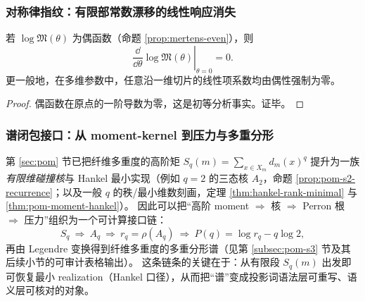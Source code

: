 \subsubsection{对称律指纹：有限部常数漂移的线性响应消失}
\begin{corollary}[偶性 \texorpdfstring{$\Rightarrow$}{=>} 一阶项消失]\label{cor:pom-logm-linear-response-zero}
若 \(\log\mathfrak{M}(\theta)\) 为偶函数（命题 \ref{prop:mertens-even}），则
$$
\left.\frac{\dd}{\dd\theta}\log\mathfrak{M}(\theta)\right|_{\theta=0}=0.
$$
更一般地，在多维参数中，任意沿一维切片的线性项系数均由偶性强制为零。
\end{corollary}
\begin{proof}
偶函数在原点的一阶导数为零，这是初等分析事实。证毕。
\end{proof}

\subsubsection{谱闭包接口：从 moment-kernel 到压力与多重分形}
\begin{remark}\label{rem:pom-moment-kernel-chain}
第 \ref{sec:pom} 节已把纤维多重度的高阶矩
\(
S_q(m)=\sum_{x\in X_m}d_m(x)^q
\)
提升为一族\emph{有限维碰撞核}与 Hankel 最小实现（例如 \(q=2\) 的三态核 \(A_2\)，命题 \ref{prop:pom-s2-recurrence}；以及一般 \(q\) 的秩/最小维数刻画，定理 \ref{thm:hankel-rank-minimal} 与 \ref{thm:pom-moment-hankel}）。
因此可以把“高阶 moment \(\Rightarrow\) 核 \(\Rightarrow\) Perron 根 \(\Rightarrow\) 压力”组织为一个可计算接口链：
$$
S_q\ \Longrightarrow\ A_q\ \Longrightarrow\ r_q=\rho(A_q)\ \Longrightarrow\ P(q)=\log r_q-q\log 2,
$$
再由 Legendre 变换得到纤维多重度的多重分形谱（见第 \ref{subsec:pom-s3} 节及其后续小节的可审计表格输出）。
这条链条的关键在于：从有限段 \(S_q(m)\) 出发即可恢复最小 realization（Hankel 口径），从而把“谱”变成投影词语法层可重写、语义层可核对的对象。
\end{remark}

